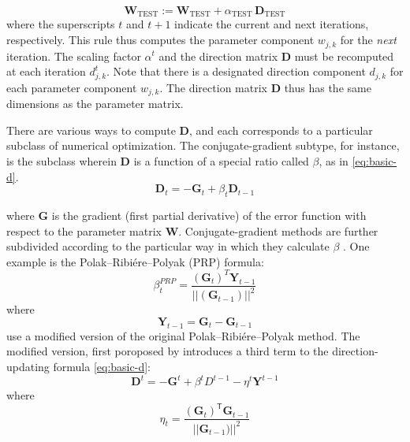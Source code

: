\begin{equation}\label{eq:gen-update}
\textbf{W}_{\text{TEST}} := \textbf{W}_{\text{TEST}} + \alpha_{\text{TEST}} \, \textbf{D}_{\text{TEST}}
\end{equation}
where the superscripts $t$ and $t+1$ indicate the current and next 
iterations, respectively. This rule thus computes the parameter component 
$w_{j,k}$ for the \emph{next} iteration. The scaling factor $\alpha^{t}$ 
and the direction matrix $\textbf{D}$ must be recomputed at each iteration 
$d^{t}_{j,k}$. Note that there is a designated direction component $d_{j,k}$ 
for each parameter component $w_{j,k}$. The direction matrix $\textbf{D}$ 
thus has the same dimensions as the parameter matrix. 

There are various ways to compute $\textbf{D}$, and each corresponds to a 
particular subclass of numerical optimization. The conjugate-gradient subtype, 
for instance, is the subclass wherein $\textbf{D}$ is a function 
of a special ratio called $\beta$, as in \eqref{eq:basic-d}. 
\begin{equation}\label{eq:basic-d}
\textbf{D}_{t} = -\textbf{G}_{t}  + \beta_{t} \textbf{D}_{t-1} 
\end{equation}

where \textbf{G} is the gradient (first partial derivative) of the error function with respect to the parameter matrix $\textbf{W}$.
Conjugate-gradient methods are further subdivided according to the particular way in which they calculate $\beta$ \citet[For an overview of the available options, see][]{hager:2006}. One example is the Polak--Ribi\'{e}re--Polyak (PRP) formula:
\begin{equation}\label{eq:PRP}
\beta_{t}^{PRP} = \frac{(\textbf{G}_{t})^{T}{\textbf{Y}_{t-1}}}{{||(\textbf{G}_{t-1})||}^2}
\end{equation}
where
\begin{equation}\label{eq:y}
\textbf{Y}_{t-1} = \textbf{G}_{t} - \textbf{G}_{t-1} 
\end{equation}
\citet{cheng-and-li:2012} use a modified version of the original Polak--Ribi\'{e}re--Polyak method. The modified version, first poroposed by \citet{zhang-et-al:2006} introduces a third term to the direction-updating formula \eqref{eq:basic-d}:
\begin{equation}\label{eq:mod-d-update}
\textbf{D}^{t} = -\textbf{G}^{t}  + \beta^{t} D^{t-1} - \eta^{t} \textbf{Y}^{t-1}
\end{equation}
where 
\begin{equation}
\label{eq:eta}
\eta_{t} = \frac{(\textbf{G}_{t})^{\textsf{T}}{\textbf{G}_{t-1}}}{{||\textbf{G}_{t-1})||}^2}
\end{equation}

